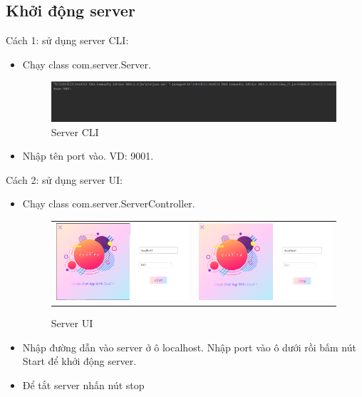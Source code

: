 \documentclass[a4paper]{article}
\begin{document}
	  \subsection{Khởi động server}
	Cách 1: sử dụng server CLI:
	\begin{itemize}
		\item Chạy class com.server.Server.
		\newline
		\begin{figure}[h!]
			\centering
			\includegraphics[width=\linewidth]{server_CLI.PNG}
			\caption{Server CLI}
			\label{fig:my_label}
		\end{figure}
		\item Nhập tên port vào. VD: 9001.
	\end{itemize}
	Cách 2: sử dụng server UI:
	\begin{itemize}
		\item Chạy class com.server.ServerController.
		\newline
		\begin{figure}[h!]
			\centering
			\begin{tabular}{c c}
				\includegraphics[width=7cm]{server_Launcher.PNG} &
			
				\includegraphics[width=7cm]{stop-server.PNG}
			\end{tabular}
			\caption{Server UI}
			\label{fig:my_label}
		\end{figure}
		\item Nhập đường dẫn vào server ở ô localhost. Nhập port vào ô dưới rồi bấm nút Start để khởi động server.
		\item Để tắt server nhấn nút stop
	\end{itemize}
\end{document}
